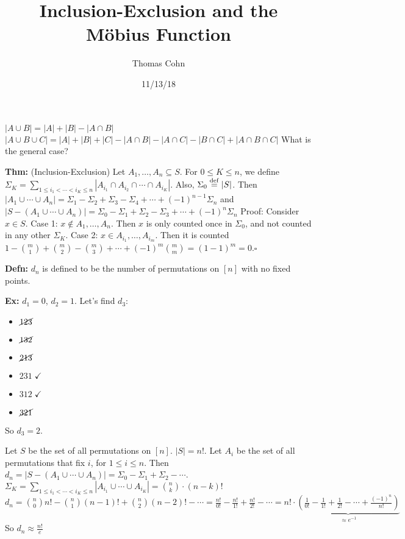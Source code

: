 \documentclass[10pt,letterpaper]{article}
\author{Thomas Cohn}
\title{Inclusion-Exclusion and the M\"obius Function}
\date{11/13/18} %
\newcommand{\n}{\hfill\break}
\newcommand{\defn}[1]{\par\noindent\settowidth{\hangindent}{\textbf{Defn: }}\textbf{Defn: }#1\n}
\newcommand{\thm}[1]{\par\noindent\settowidth{\hangindent}{\textbf{Thm: }}\textbf{Thm: }#1\n}
\newcommand{\ex}[1]{\par\noindent\settowidth{\hangindent}{\textbf{Ex: }}\textbf{Ex: }#1\n}
\newcommand{\proven}{\;$\square$\n}
\newcommand{\ptxt}[1]{\textrm{\textnormal{#1}}}
\newcommand{\card}[1]{\left|#1\right|}
\newcommand{\inv}{^{-1}}
\begin{document}
\maketitle
\setlength\RaggedRightParindent{\parindent}
\RaggedRight

\par\noindent $\card{A\cup{}B}=\card{A}+\card{B}-\card{A\cap{}B}$\n
$\card{A\cup{}B\cup{}C}=\card{A}+\card{B}+\card{C}-\card{A\cap{}B}-\card{A\cap{}C}-\card{B\cap{}C}+\card{A\cap{}B\cap{}C}$\n
What is the general case?\n

\thm{(Inclusion-Exclusion) Let $A_{1},\ldots,A_{n}\subseteq{}S$. For $0\le{}K\le{}n$, we define $\displaystyle\Sigma_{K}=\sum_{1\le{}i_{1}<\cdots<i_{K}\le{}n}\card{A_{i_{1}}\cap{}A_{i_{2}}\cap\cdots\cap{}A_{i_{K}}}$. Also, $\Sigma_{0}\overset{\ptxt{def}}{=}\card{S}$.\n
Then $\card{A_{1}\cup\cdots\cup{}A_{n}}=\Sigma_{1}-\Sigma_{2}+\Sigma_{3}-\Sigma_{4}+\cdots+(-1)^{n-1}\Sigma_{n}$\n
and $\card{S-(A_{1}\cup\cdots\cup{}A_{n})}=\Sigma_{0}-\Sigma_{1}+\Sigma_{2}-\Sigma_{3}+\cdots+(-1)^{n}\Sigma_{n}$\n
\n
Proof: Consider $x\in{}S$. Case 1: $x\not\in{}A_{1},\ldots,A_{n}$. Then $x$ is only counted once in $\Sigma_{0}$, and not counted in any other $\Sigma_{K}$.\n
Case 2: $x\in{}A_{i_{1}},\ldots,A_{i_{m}}$. Then it is counted $1-\binom{m}{1}+\binom{m}{2}-\binom{m}{3}+\cdots+(-1)^{m}\binom{m}{m}=(1-1)^{m}=0$.\proven}

\defn{$d_{n}$ is defined to be the number of permutations on $[n]$ with no fixed points.}

\ex{$d_{1}=0$, $d_{2}=1$. Let's find $d_{3}$:
\begin{itemize}
	\item $\cancel{123}$
	\item $\cancel{132}$
	\item $\cancel{213}$
	\item $231\;\checkmark$
	\item $312\;\checkmark$
	\item $\cancel{321}$
\end{itemize}
So $d_{3}=2$.}

\par\noindent Let $S$ be the set of all permutations on $[n]$. $\card{S}=n!$.\n
Let $A_{i}$ be the set of all permutations that fix $i$, for $1\le{}i\le{}n$.\n
Then $d_{n}=\card{S-(A_{1}\cup\cdots\cup{}A_{n})}=\Sigma_{0}-\Sigma_{1}+\Sigma_{2}-\cdots$.\n
$\displaystyle\Sigma_{K}=\sum_{1\le{}i_{1}<\cdots<i_{K}\le{}n}\card{A_{i_{1}}\cup\cdots\cup{}A_{i_{K}}}=\binom{n}{k}\cdot(n-k)!$\n
$d_{n}=\binom{n}{0}n!-\binom{n}{1}(n-1)!+\binom{n}{2}(n-2)!-\cdots=\frac{n!}{0!}-\frac{n!}{1!}+\frac{n!}{2!}-\cdots=n!\cdot\underbrace{\left(\frac{1}{0!}-\frac{1}{1!}+\frac{1}{2!}-\cdots+\frac{(-1)^{n}}{n!}\right)}_{\approx{}e\inv}$\n
So $d_{n}\approx\frac{n!}{e}$\n
\end{document}
